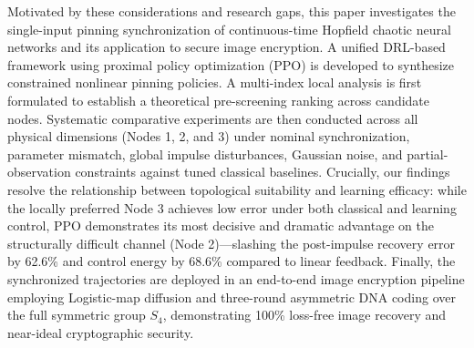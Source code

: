 \documentclass[a4paper,fleqn]{cas-sc}
\theoremstyle{plain}
\theoremstyle{definition}
\begin{document}
Motivated by these considerations and research gaps, this paper investigates the single-input pinning synchronization of continuous-time Hopfield chaotic neural networks and its application to secure image encryption. A unified DRL-based framework using proximal policy optimization (PPO) is developed to synthesize constrained nonlinear pinning policies. A multi-index local analysis is first formulated to establish a theoretical pre-screening ranking across candidate nodes. Systematic comparative experiments are then conducted across all physical dimensions (Nodes 1, 2, and 3) under nominal synchronization, parameter mismatch, global impulse disturbances, Gaussian noise, and partial-observation constraints against tuned classical baselines. Crucially, our findings resolve the relationship between topological suitability and learning efficacy: while the locally preferred Node 3 achieves low error under both classical and learning control, PPO demonstrates its most decisive and dramatic advantage on the structurally difficult channel (Node 2)—slashing the post-impulse recovery error by 62.6\% and control energy by 68.6\% compared to linear feedback. Finally, the synchronized trajectories are deployed in an end-to-end image encryption pipeline employing Logistic-map diffusion and three-round asymmetric DNA coding over the full symmetric group $S_4$, demonstrating 100\% loss-free image recovery and near-ideal cryptographic security.
\end{document}

